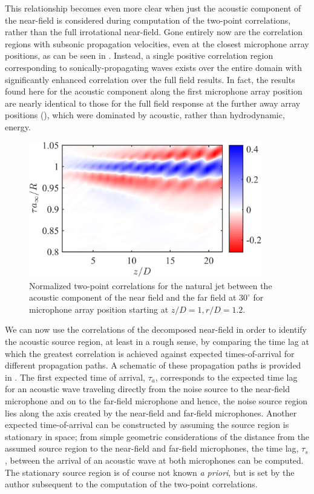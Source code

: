 This relationship becomes even more clear when just the acoustic component of the near-field is considered during computation of the two-point correlations, rather than the full irrotational near-field. 
Gone entirely now are the correlation regions with subsonic propagation velocities, even at the closest microphone array positions, as can be seen in .
Instead, a single positive correlation region corresponding to sonically-propagating waves exists over the entire domain with significantly enhanced correlation over the full field results. 
In fact, the results found here for the acoustic component along the first microphone array position are nearly identical to those for the full field response at the further away array positions (), which were dominated by acoustic, rather than hydrodynamic, energy.
\begin{figure}
	\centering
	\includegraphics[width=4in]{Figures/ch3_St000_xcorr_acoustic.png}
	\caption{Normalized two-point correlations for the natural jet between the acoustic component of the near field and the far field at $30^\circ$ for microphone array position starting at $z/D = 1, r/D = 1.2$. }
	\label{fig:ch3_St000_acoustic}
\end{figure}

We can now use the correlations of the decomposed near-field in order to identify the acoustic source region, at least in a rough sense, by comparing the time lag at which the greatest correlation is achieved against expected times-of-arrival for different propagation paths.
A schematic of these propagation paths is provided in .
The first expected time of arrival, $\tau_a$, corresponds to the expected time lag for an acoustic wave traveling directly from the noise source to the near-field microphone and on to the far-field microphone and hence, the noise source region lies along the axis created by the near-field and far-field microphones.
Another expected time-of-arrival can be constructed by assuming the source region is stationary in space; from simple geometric considerations of the distance from the assumed source region to the near-field and far-field microphones, the time lag, $\tau_s$, between the arrival of an acoustic wave at both microphones can be computed.
The stationary source region is of course not known \textit{a priori}, but is set by the author subsequent to the computation of the two-point correlations.

